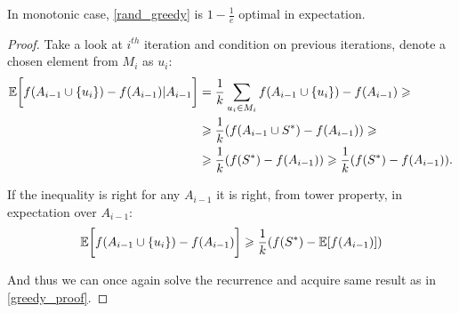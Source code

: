 \begin{theorem}
	In monotonic case, \cref{rand_greedy} is $1-\frac{1}{e}$ optimal in expectation.
	\begin{proof}
		Take a look at $i^{th}$ iteration and condition on previous iterations, denote a chosen element from $M_i$ as $u_i$:
		\begin{align}
		\mathbb{E} \qty\bigg[f(A_{i-1} \cup \qty{u_i}) - f(A_{i-1}) | A_{i-1} ] &= \frac{1}{k} \sum_{u_i \in M_i} f(A_{i-1} \cup \qty{u_i}) - f(A_{i-1}) \geqslant\\&\geqslant \frac{1}{k} \qty( f(A_{i-1} \cup S^*) - f(A_{i-1}) ) \geqslant\\&\geqslant \frac{1}{k} \qty( f(S^*) - f(A_{i-1}))\geqslant \frac{1}{k} \qty( f(S^*) - f(A_{i-1})).
		\end{align}
		
		If the inequality is right for any $A_{i-1}$ it is right, from tower property, in expectation over $A_{i-1}$:
		\begin{align}
		\mathbb{E} \qty\bigg[f(A_{i-1} \cup \qty{u_i}) - f(A_{i-1}) ] \geqslant 	\frac{1}{k} \qty( f(S^*) - \mathbb{E} \qty[ f(A_{i-1})] )
		\end{align}
		
		And thus we can once again solve the recurrence and acquire same result as in \vref{greedy_proof}.
	\end{proof}
\end{theorem}
